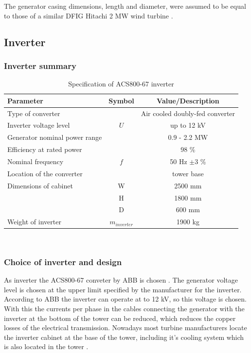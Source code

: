 The generator casing dimensions, length and diameter, were assumed to be equal to those of a similar DFIG Hitachi 2 MW wind turbine \cite{hitachi}.



\newpage
\subsection{Inverter}

\subsubsection{Inverter summary}

\begin{table}[h]
\centering
\caption{Specification of ACS800-67 inverter}
\label{tab:inverter}
\begin{tabular}{ |l|c|c|} 
\hline
\textbf{Parameter} & Symbol & \textbf{Value/Description} \\ 
\hline
Type of converter & & Air cooled doubly-fed converter \\
\hline
Inverter voltage level & $U$ & up to 12 kV\\
\hline
Generator nominal power range & & 0.9 - 2.2 MW \\
\hline
Efficiency at rated power & & 98 \% \\ 
\hline
Nominal frequency & $f$ & 50 Hz $\pm 3$ \% \\
\hline
Location of the converter & & tower base  \\ 
\hline
Dimensions of cabinet & W & 2500 mm \\
\hline
& H & 1800 mm \\
\hline
& D & 600 mm \\
\hline
Weight of inverter & $m_{inverter}$ & 1900 kg \\
\hline
\end{tabular} \\
\end{table}


\subsubsection{Choice of inverter and design}

As inverter the ACS800-67 conveter by ABB is chosen \cite{ABB}. The generator voltage level is chosen at the upper limit specified by the manufacturer for the inverter. According to ABB the inverter can operate at to 12 kV, so this voltage is chosen. With this the currents per phase in the cables connecting the generator with the inverter at the bottom of the tower can be reduced, which reduces the copper losses of the electrical transmission. Nowadays most turbine manufacturers locate the inverter cabinet at the base of the tower, including it's cooling system which is also located in the tower \cite{hau}.


